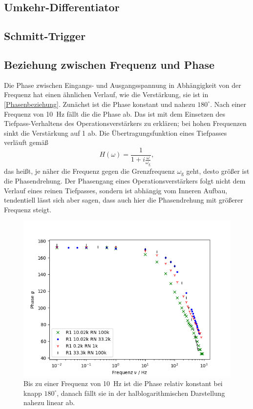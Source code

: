 \FloatBarrier

\subsection{Umkehr-Differentiator}

\FloatBarrier

\subsection{Schmitt-Trigger}

\FloatBarrier

\subsection{Beziehung zwischen Frequenz und Phase}

Die Phase zwischen Eingangs- und Ausgangsspannung in Abhängigkeit von der Frequenz hat einen ähnlichen Verlauf, wie die Verstärkung, sie ist in \autoref{Phasenbeziehung}. Zunächst ist die Phase konstant und nahezu $180^\circ$. Nach einer Frequenz von \SI{10}{\hertz} fällt die die Phase ab. Das ist mit dem Einsetzen des Tiefpass-Verhaltens des Operationsverstärkers zu erklären; bei hohen Frequenzen sinkt die Verstärkung auf 1 ab. Die Übertragungsfunktion eines Tiefpasses verläuft gemäß
\begin{equation}
	H(\omega) = \frac{1}{1 + i\frac{\omega}{\omega_\text{g}}},
\end{equation}
das heißt, je näher die Frequenz gegen die Grenzfrequenz $\omega_\text{g}$ geht, desto größer ist die Phasendrehung. Der Phasengang eines Operationsverstärkers folgt nicht dem Verlauf eines reinen Tiefpasses, sondern ist abhängig vom Inneren Aufbau, tendentiell lässt sich aber sagen, dass auch hier die Phasendrehung mit größerer Frequenz steigt.

\begin{figure}[h]
	\centering
	\includegraphics[width=\textwidth]{img/j.png}
	\caption{Bis zu einer Frequenz von \SI{10}{\hertz} ist die Phase relativ konstant bei knapp $180^\circ$, danach fällt sie in der halblogarithmischen Darstellung nahezu linear ab.}
	\label{Phasenbeziehung}
\end{figure}

\FloatBarrier
